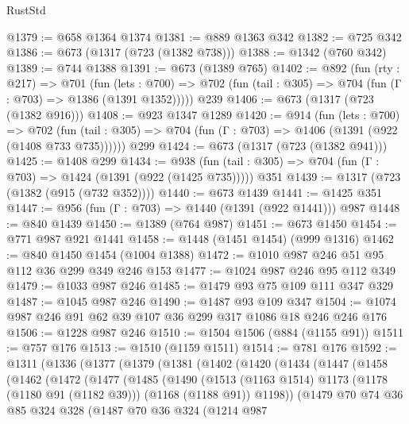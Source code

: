 \begin{lexlean}{RustStd}
\begin{coremodule}
{\begin{coremodule}
{{{{{{{{{{@1379 := @658 @1364 @1374
@1381 := @889 @1363 @342
@1382 := @725 @342
@1386 := @673 (@1317 (@723 (@1382 @738)))
@1388 := @1342 (@760 @342)
@1389 := @744 @1388
@1391 := @673 (@1389 @765)
@1402 := @892
    (fun (rty : @217) =>
    @701
      (fun (lets : @700) =>
      @702 (fun (tail : @305) => @704 (fun (Γ : @703) => @1386 (@1391 @1352)))))
    @239
@1406 := @673 (@1317 (@723 (@1382 @916)))
@1408 := @923 @1347 @1289
@1420 := @914
    (fun (lets : @700) =>
    @702 (fun (tail : @305) => @704 (fun (Γ : @703) => @1406 (@1391 (@922 (@1408 @733 @735))))))
    @299
@1424 := @673 (@1317 (@723 (@1382 @941)))
@1425 := @1408 @299
@1434 := @938 (fun (tail : @305) => @704 (fun (Γ : @703) => @1424 (@1391 (@922 (@1425 @735))))) @351
@1439 := @1317 (@723 (@1382 (@915 (@732 @352))))
@1440 := @673 @1439
@1441 := @1425 @351
@1447 := @956 (fun (Γ : @703) => @1440 (@1391 (@922 @1441))) @987
@1448 := @840 @1439
@1450 := @1389 (@764 @987)
@1451 := @673 @1450
@1454 := @771 @987 @921 @1441
@1458 := @1448 (@1451 @1454) (@999 @1316)
@1462 := @840 @1450 @1454 (@1004 @1388)
@1472 := @1010 @987 @246 @51 @95 @112 @36 @299 @349 @246 @153
@1477 := @1024 @987 @246 @95 @112 @349
@1479 := @1033 @987 @246
@1485 := @1479 @93 @75 @109 @111 @347 @329
@1487 := @1045 @987 @246
@1490 := @1487 @93 @109 @347
@1504 := @1074 @987 @246 @91 @62 @39 @107 @36 @299 @317 @1086 @18 @246 @246 @176
@1506 := @1228 @987 @246
@1510 := @1504 @1506 (@884 (@1155 @91))
@1511 := @757 @176
@1513 := @1510 (@1159 @1511)
@1514 := @781 @176
@1592 := @1311
    (@1336
      (@1377
        (@1379
          (@1381
            (@1402
              (@1420
                (@1434
                  (@1447
                    (@1458
                      (@1462
                        (@1472
                          (@1477
                            (@1485
                              (@1490
                                (@1513
                                  (@1163 @1514)
                                  @1173
                                  (@1178 (@1180 @91 (@1182 @39)))
                                  (@1168 (@1188 @91))
                                  @1198))
                              (@1479
                                @70
                                @74
                                @36
                                @85
                                @324
                                @328
                                (@1487
                                  @70
                                  @36
                                  @324
                                  (@1214
                                    @987
}}}}}}}}}}
\end{coremodule}}
\end{coremodule}
\end{lexlean}
